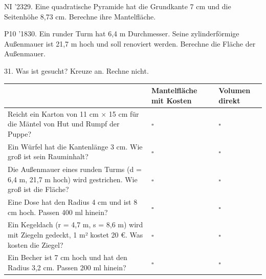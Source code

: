 \documentclass[11pt]{article}
\begin{document}
\pfgruppe{}
\begin{pfaufg}{NI ’23}{29.}{}
Eine quadratische Pyramide hat die Grundkante 7 cm und die Seitenhöhe 8,73 cm. Berechne ihre Mantelfläche.
\end{pfaufg}
\pfgruppe{}
\begin{pfaufg}{P10 ’18}{30.}{}
Ein runder Turm hat 6,4 m Durchmesser. Seine zylinderförmige Außenmauer ist 21,7 m hoch und soll renoviert werden. Berechne die Fläche der Außenmauer.
\end{pfaufg}

\par\Needspace*{0.55\textheight}
\begin{pfaufg}{}{31.}{}
Was ist gesucht? Kreuze an. Rechne nicht.
\par\smallskip\noindent \begingroup\renewcommand{\arraystretch}{1.4}\begin{tabular}{|>{\raggedright\arraybackslash}p{8.3cm}|>{\centering\arraybackslash\hyphenpenalty=0}p{1.55cm}|>{\centering\arraybackslash\hyphenpenalty=0}p{1.55cm}|}\hline  & {\scriptsize\hspace{0pt}Mantelfläche mit Kosten} & {\scriptsize\hspace{0pt}Volumen direkt} \\ \hline Reicht ein Karton von 11 cm × 15 cm für die Mäntel von Hut und Rumpf der Puppe? & $\square$ & $\square$ \\ \hline Ein Würfel hat die Kantenlänge 3 cm. Wie groß ist sein Rauminhalt? & $\square$ & $\square$ \\ \hline Die Außenmauer eines runden Turms (d = 6,4 m, 21,7 m hoch) wird gestrichen. Wie groß ist die Fläche? & $\square$ & $\square$ \\ \hline Eine Dose hat den Radius 4 cm und ist 8 cm hoch. Passen 400 ml hinein? & $\square$ & $\square$ \\ \hline Ein Kegeldach (r = 4,7 m, s = 8,6 m) wird mit Ziegeln gedeckt, 1 m² kostet 20 €. Was kosten die Ziegel? & $\square$ & $\square$ \\ \hline Ein Becher ist 7 cm hoch und hat den Radius 3,2 cm. Passen 200 ml hinein? & $\square$ & $\square$ \\ \hline\end{tabular}\endgroup\par
\end{pfaufg}
\end{document}

